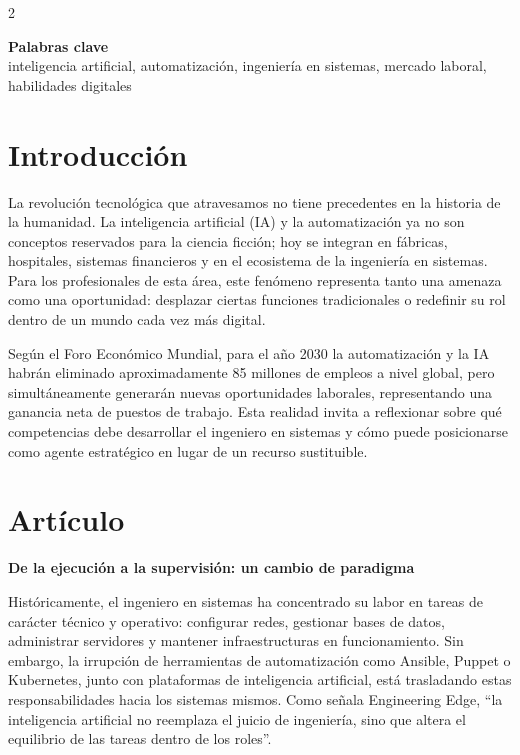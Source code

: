 \documentclass[10pt,spanish,Letterpaper,openany]{book}
\let\origtextbf\textbf
\renewcommand{\textbf}[1]{{\color{textlinetitle}\origtextbf{#1}}}
\begin{document}
\begin {multicols}{2}

\textbf{Palabras clave}\\
inteligencia artificial, automatización, ingeniería en sistemas, mercado laboral, habilidades digitales

\section{Introducción}\label{introducciuxf3n-11}

La revolución tecnológica que atravesamos no tiene precedentes en la historia de la humanidad. La inteligencia artificial (IA) y la automatización ya no son conceptos reservados para la ciencia ficción; hoy se integran en fábricas, hospitales, sistemas financieros y en el ecosistema de la ingeniería en sistemas. Para los profesionales de esta área, este fenómeno representa tanto una amenaza como una oportunidad: desplazar ciertas funciones tradicionales o redefinir su rol dentro de un mundo cada vez más digital.

Según el Foro Económico Mundial, para el año 2030 la automatización y la IA habrán eliminado aproximadamente 85 millones de empleos a nivel global, pero simultáneamente generarán nuevas oportunidades laborales, representando una ganancia neta de puestos de trabajo. Esta realidad invita a reflexionar sobre qué competencias debe desarrollar el ingeniero en sistemas y cómo puede posicionarse como agente estratégico en lugar de un recurso sustituible.

\section{Artículo}\label{artuxedculo-7}

\textbf{De la ejecución a la supervisión: un cambio de paradigma}

Históricamente, el ingeniero en sistemas ha concentrado su labor en tareas de carácter técnico y operativo: configurar redes, gestionar bases de datos, administrar servidores y mantener infraestructuras en funcionamiento. Sin embargo, la irrupción de herramientas de automatización como Ansible, Puppet o Kubernetes, junto con plataformas de inteligencia artificial, está trasladando estas responsabilidades hacia los sistemas mismos. Como señala Engineering Edge, ``la inteligencia artificial no reemplaza el juicio de ingeniería, sino que altera el equilibrio de las tareas dentro de los roles''.


\end{multicols}
\end{document}
